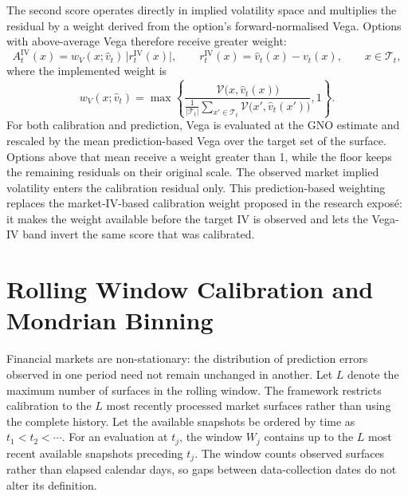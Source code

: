 The second score operates directly in implied volatility space and multiplies the residual by a weight derived from the option's forward-normalised Vega. Options with above-average Vega therefore receive greater weight:
\begin{equation}
    A^{\text{IV}}_t(x)
    = w_V(x;\hat v_t)\,\big|r^{\text{IV}}_t(x)\big|,
    \qquad
    r^{\text{IV}}_t(x)=\hat{v}_t(x)-v_t(x),
    \qquad x\in\mathcal{T}_t,
    \label{eq:score_b}
\end{equation}
where the implemented weight is
\begin{equation}
    w_V(x;\hat v_t)
    = \max\!\left\{
        \frac{\mathcal{V}\big(x,\hat v_t(x)\big)}
        {\frac{1}{|\mathcal{T}_t|}\sum_{x'\in\mathcal{T}_t}
        \mathcal{V}\big(x',\hat v_t(x')\big)},
        1
      \right\}.
    \label{eq:score_b_weight}
\end{equation}
For both calibration and prediction, Vega is evaluated at the GNO estimate and rescaled by the mean prediction-based Vega over the target set of the surface. Options above that mean receive a weight greater than 1, while the floor keeps the remaining residuals on their original scale. The observed market implied volatility enters the calibration residual only. This prediction-based weighting replaces the market-IV-based calibration weight proposed in the research expos\'e: it makes the weight available before the target IV is observed and lets the Vega-IV band invert the same score that was calibrated.

\section{Rolling Window Calibration and Mondrian Binning}
\label{sec:meth_calibration}

Financial markets are non-stationary: the distribution of prediction errors observed in one period need not remain unchanged in another. Let $L$ denote the maximum number of surfaces in the rolling window. The framework restricts calibration to the $L$ most recently processed market surfaces rather than using the complete history. Let the available snapshots be ordered by time as $t_1<t_2<\cdots$. For an evaluation at $t_j$, the window $W_j$ contains up to the $L$ most recent available snapshots preceding $t_j$. The window counts observed surfaces rather than elapsed calendar days, so gaps between data-collection dates do not alter its definition.

